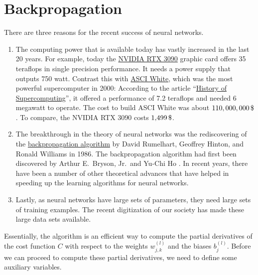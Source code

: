 \section{Backpropagation}
There are three reasons for the recent success of neural networks.
\begin{enumerate}
\item The computing power that is available today has vastly increased in the last 20 years.
      For example, today the
      \href{https://www.nvidia.com/en-us/geforce/graphics-cards/30-series/rtx-3090/}{NVIDIA RTX 3090}
      graphic card offers 35 teraflops in single precision performance. It needs a power supply that
      outputs 750 watt. Contrast this with \href{https://en.wikipedia.org/wiki/ASCI_White}{ASCI White}, which
      was the most powerful supercomputer in 2000: According to the article
      ``\href{https://en.wikipedia.org/wiki/History_of_supercomputing}{History of Supercomputing}'', 
      it  offered a performance of 7.2 teraflops and needed 6 megawatt to operate.  The cost to build ASCI
      White was about $110,000,000\,\symbol{36}$.   To compare, the NVIDIA RTX 3090 costs $1,\!499\,\symbol{36}$.
\item The breakthrough in the theory of neural networks was the rediscovering of the
      \href{https://en.wikipedia.org/wiki/Backpropagation}{backpropagation algorithm}  by
      David Rumelhart, Geoffrey Hinton, and Ronald Williams \cite{rumelhart:1986} in 1986.  
      The backpropagation algorithm had first been discovered by Arthur E.~Bryson, Jr.~and Yu-Chi Ho
      \cite{bryson:1969}.  In recent years, there have been a number of other theoretical advances that have
      helped in speeding up the learning algorithms for neural networks.
\item Lastly, as neural networks have large sets of parameters, they need large sets of training examples.  The
      recent digitization of our society has made these large data sets available.
\end{enumerate}
Essentially, the  algorithm is an efficient way to compute the partial derivatives of the
cost function $C$ with respect to the weights $w_{j,k}^{(l)}$ and the biases $b_j^{(l)}$.  Before we can
proceed to compute these partial derivatives, we need to define some auxiliary variables. 

